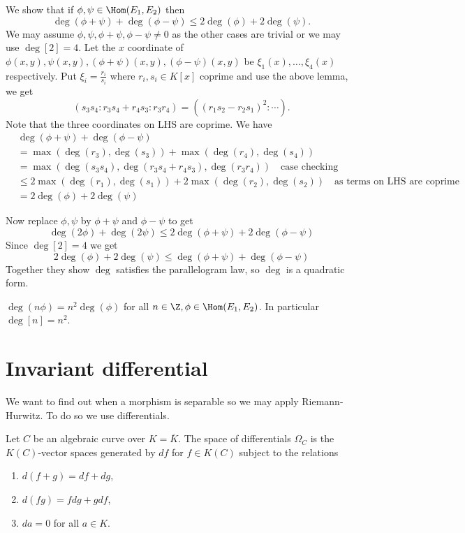\documentclass[a4paper]{article}
\theoremstyle{definition}
\theoremstyle{theorem}
\begin{document}
We show that if \(\phi, \psi \in \Hom(E_1, E_2)\) then
\[
  \deg (\phi + \psi) + \deg (\phi - \psi) \leq 2 \deg(\phi) + 2 \deg(\psi).
\]
We may assume \(\phi, \psi, \phi + \psi, \phi - \psi \neq 0\) as the other cases are trivial or we may use \(\deg [2] = 4\). Let the \(x\) coordinate of \(\phi(x, y), \psi(x, y), (\phi + \psi)(x, y), (\phi - \psi)(x, y)\) be \(\xi_1(x), \dots, \xi_4(x)\) respectively. Put \(\xi_i = \frac{r_i}{s_i}\) where \(r_i, s_i \in K[x]\) coprime and use the above lemma, we get
\[
  (s_3s_4: r_3s_4 + r_4s_3: r_3r_4) = ((r_1s_2 - r_2s_1)^2: \cdots ).
\]
Note that the three coordinates on LHS are coprime. We have
\begin{align*}
  &\deg (\phi + \psi) + \deg (\phi - \psi) \\
  &= \max(\deg (r_3), \deg (s_3)) + \max (\deg (r_4), \deg (s_4)) \\
  &= \max(\deg (s_3s_4), \deg (r_3s_4 + r_4s_3), \deg (r_3r_4)) \quad \text{case checking} \\
  &\leq 2 \max(\deg(r_1), \deg(s_1)) + 2 \max(\deg (r_2), \deg (s_2)) \quad \text{as terms on LHS are coprime} \\
  &= 2 \deg (\phi) + 2 \deg (\psi)
\end{align*}

Now replace \(\phi, \psi\) by \(\phi + \psi\) and \(\phi - \psi\) to get
\[
  \deg (2\phi) + \deg (2\psi) \leq 2 \deg (\phi + \psi) + 2 \deg(\phi - \psi)
\]
Since \(\deg [2] = 4\) we get
\[
  2 \deg (\phi) + 2 \deg (\psi) \leq \deg (\phi + \psi) + \deg (\phi - \psi)
\]
Together they show \(\deg\) satisfies the parallelogram law, so \(\deg\) is a quadratic form.

\begin{corollary}
  \(\deg (n\phi) = n^2 \deg (\phi)\) for all \(n \in \Z, \phi \in \Hom(E_1, E_2)\). In particular \(\deg [n] = n^2\).
\end{corollary}

\section{Invariant differential}

We want to find out when a morphism is separable so we may apply Riemann-Hurwitz. To do so we use differentials.

Let \(C\) be an algebraic curve over \(K = \overline K\). The space of differentials \(\Omega_C\) is the \(K(C)\)-vector spaces generated by \(df\) for \(f \in K(C)\) subject to the relations
\begin{enumerate}
\item \(d(f + g) = df + dg\),
\item \(d(fg) = f dg + g df\),
\item \(da = 0\) for all \(a \in K\).
\end{enumerate}
\end{document}
